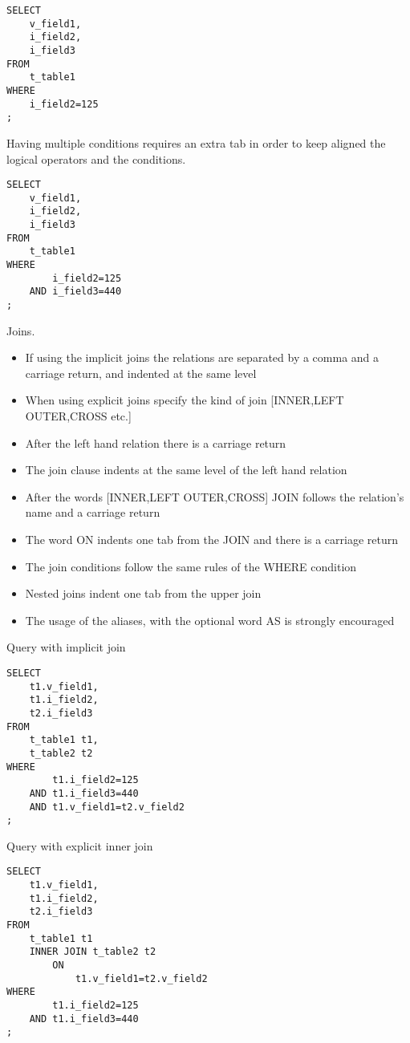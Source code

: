 \begin{lstlisting}[style=pgsql]
SELECT 
	v_field1,
	i_field2,
	i_field3 
FROM 
	t_table1 
WHERE 
	i_field2=125
;
\end{lstlisting}


Having multiple conditions requires an extra tab in order to keep aligned the logical operators and the 
conditions.

\begin{lstlisting}[style=pgsql]
SELECT 
	v_field1,
	i_field2,
	i_field3 
FROM 
	t_table1 
WHERE 
		i_field2=125
	AND	i_field3=440
;
\end{lstlisting}


Joins.
\begin{itemize}
 \item If using the implicit joins the relations are separated by a comma and a carriage return, and indented at 
the same level
 \item When using explicit joins specify the kind of join [INNER,LEFT OUTER,CROSS etc.] 
 \item After the left hand relation there is a carriage return
 \item The join clause indents at the same level of the left hand relation
 \item After the words [INNER,LEFT OUTER,CROSS] JOIN follows the relation's name and a carriage return
 \item The word ON indents one tab from the JOIN and there is a carriage return
 \item The join conditions follow the same rules of the WHERE condition
 \item Nested joins indent one tab from the upper join
 \item The usage of the aliases, with the optional word AS is strongly encouraged
 \end{itemize}

Query with implicit join
\begin{lstlisting}[style=pgsql]
SELECT 
	t1.v_field1,
	t1.i_field2,
	t2.i_field3 
FROM 
	t_table1 t1,
	t_table2 t2
WHERE 
		t1.i_field2=125
	AND	t1.i_field3=440
	AND	t1.v_field1=t2.v_field2
;
\end{lstlisting}


Query with explicit inner join
\begin{lstlisting}[style=pgsql]
SELECT 
	t1.v_field1,
	t1.i_field2,
	t2.i_field3 
FROM 
	t_table1 t1 
	INNER JOIN t_table2 t2
		ON
			t1.v_field1=t2.v_field2
WHERE 
		t1.i_field2=125
	AND	t1.i_field3=440
;
\end{lstlisting}


